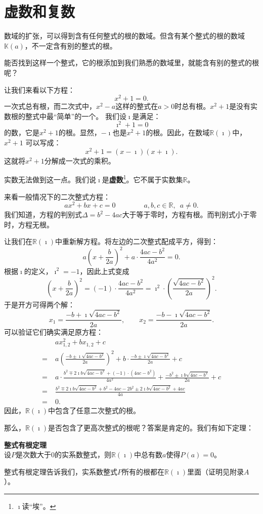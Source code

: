 \documentclass[12pt,UTF8,fontset=none]{ctexbook}
\begin{document}
\section{虚数和复数}

数域的扩张，可以得到含有任何整式的根的数域。但含有某个整式的根的数域$\mathbb{K}(a)$，不一定含有别的整式的根。

能否找到这样一个整式，它的根添加到我们熟悉的数域里，就能含有别的整式的根呢？

让我们来看以下方程：
$$ x^2 + 1 = 0.$$
一次式总有根，而二次式中，$x^2 - a$这样的整式在$a>0$时总有根。$x^2 + 1$是没有实数根的整式中最“简单”的一个。
我们设$\imath$是满足：
$$ \imath^2 + 1 = 0$$
的数，它是$x^2 + 1$的根。显然，$-\imath$也是$x^2 + 1$的根。因此，在数域$\mathbb{R}(\imath)$中，$x^2 + 1$
可以写成：
$$ x^2 + 1 = (x - \imath)(x + \imath).$$
这就将$x^2 + 1$分解成一次式的乘积。

实数无法做到这一点。我们说$\imath$是\textbf{虚数}\footnote{$\imath$读“埃”。}。它不属于实数集$\mathbb{R}$。

来看一般情况下的二次整式方程：
$$ ax^2 + bx + c = 0  \qquad \qquad a,b,c \in \mathbb{R}, \,\,\, a \neq 0. $$
我们知道，方程的判别式$\Delta = b^2 - 4ac$大于等于零时，方程有根。而判别式小于零时，方程无根。

让我们在$\mathbb{R}(\imath)$中重新解方程。将左边的二次整式配成平方，得到：
$$ a(x + \frac{b}{2a})^2 + a\cdot \frac{4ac - b^2}{4a^2} = 0. $$
根据$\imath$的定义，$\imath^2 = -1$，因此上式变成
$$ \left(x + \frac{b}{2a}\right)^2 = (-1) \cdot \frac{4ac - b^2}{4a^2} = \imath^2 \cdot \left(\frac{\sqrt{4ac - b^2}}{2a}\right)^2. $$
于是开方可得两个解：
$$ x_1 = \frac{-b + \imath \sqrt{4ac - b^2} }{2a}, \qquad x_2 = \frac{-b - \imath \sqrt{4ac - b^2} }{2a}. $$
可以验证它们确实满足原方程：
\begin{align*}
     &\; ax_{1,2}^2 + b x_{1,2} + c  \\
    =&\; a\left(\frac{-b \pm \imath \sqrt{4ac - b^2} }{2a}\right)^2 + b\cdot \frac{-b \pm \imath \sqrt{4ac - b^2} }{2a} + c \\
    =&\; a \cdot \frac{b^2 \mp 2\imath b \sqrt{4ac - b^2} + (-1)\cdot (4ac - b^2) }{4a^2} + \frac{-b^2 \pm \imath b \sqrt{4ac - b^2} }{2a} + c \\
    =&\; \frac{b^2 \mp 2\imath b \sqrt{4ac - b^2} + b^2 - 4ac -2b^2 \pm 2 \imath b \sqrt{4ac - b^2} + 4ac }{4a} \\
    =&\; 0.
\end{align*}
因此，$\mathbb{R}(\imath)$中包含了任意二次整式的根。

那么，$\mathbb{R}(\imath)$是否包含了更高次整式的根呢？答案是肯定的。我们有如下定理：
\begin{tm}{\textbf{整式有根定理}}
    \mbox{} \\
    \indent 设$P$是次数大于$0$的实系数整式，则$\mathbb{R}(\imath)$中总有数$a$使得$P(a) = 0$。
\end{tm}
整式有根定理告诉我们，实系数整式$P$所有的根都在$\mathbb{R}(\imath)$里面（证明见附录$A$）。
\end{document}
